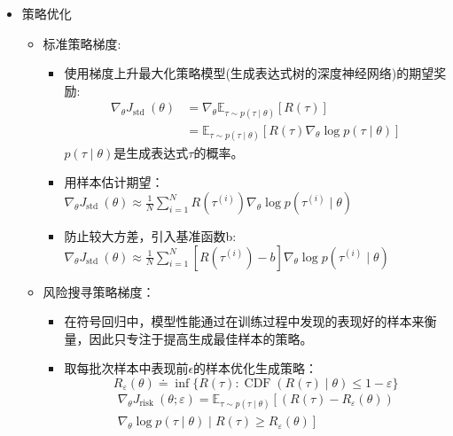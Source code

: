 \documentclass[CJK,aspectratio=169]{beamer}  %
\begin{document}
	\begin{frame}
		\begin{itemize}
			\item 策略优化
			\begin{itemize}
				\item 标准策略梯度:
				\begin{itemize}
					\item 使用梯度上升最大化策略模型(生成表达式树的深度神经网络)的期望奖励:
					$$
					\begin{aligned}
						\nabla_\theta J_{\text {std }}(\theta) & =\nabla_\theta \mathbb{E}_{\tau \sim p(\tau \mid \theta)}[R(\tau)] \\
						& =\mathbb{E}_{\tau \sim p(\tau \mid \theta)}\left[R(\tau) \nabla_\theta \log p(\tau \mid \theta)\right]
					\end{aligned}
					$$
					$p(\tau \mid \theta)\text{是生成表达式$\tau$的概率}$。
					\item 用样本估计期望：$\nabla_\theta J_{\text {std }}(\theta) \approx \frac{1}{N} \sum_{i=1}^N R\left(\tau^{(i)}\right) \nabla_\theta \log p\left(\tau^{(i)} \mid \theta\right)$
					\item 防止较大方差，引入基准函数b:$\nabla_\theta J_{\text {std }}(\theta) \approx \frac{1}{N} \sum_{i=1}^N\left[R\left(\tau^{(i)}\right)-b\right] \nabla_\theta \log p\left(\tau^{(i)} \mid \theta\right)$
				\end{itemize}
				\item 风险搜寻策略梯度：
				\begin{itemize}
					\item 在符号回归中，模型性能通过在训练过程中发现的表现好的样本来衡量，因此只专注于提高生成最佳样本的策略。
					\item 取每批次样本中表现前$\epsilon$的样本优化生成策略：
					$$
					R_{\varepsilon}(\theta) \doteq \inf \{R(\tau): \operatorname{CDF}(R(\tau) \mid \theta) \leq 1-\varepsilon\}
					$$
					$$\begin{aligned} \nabla_\theta J_{\text {risk }}(\theta ; \varepsilon)=\mathbb{E}_{\tau \sim p(\tau \mid \theta)}\left[\left(R(\tau)-R_{\varepsilon}(\theta)\right)\right. \\ \left.\nabla_\theta \log p(\tau \mid \theta) \mid R(\tau) \geq R_{\varepsilon}(\theta)\right]\end{aligned}$$
				\end{itemize}
			\end{itemize}
		\end{itemize}
	\end{frame}
\end{document}
